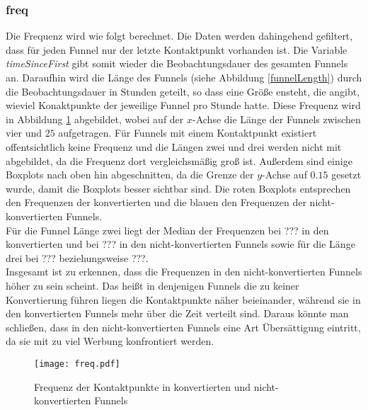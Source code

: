 \subsubsection*{freq}
Die Frequenz wird wie folgt berechnet. Die Daten werden dahingehend gefiltert, dass für jeden Funnel nur der letzte Kontaktpunkt vorhanden ist. Die Variable \textit{timeSinceFirst} gibt somit wieder die Beobachtungsdauer des gesamten Funnels an. Daraufhin wird die Länge des Funnels (siehe Abbildung \ref{funnelLength}) durch die Beobachtungsdauer in Stunden geteilt, so dass eine Größe ensteht, die angibt, wieviel Konaktpunkte der jeweilige Funnel pro Stunde hatte. Diese Frequenz wird in Abbildung \ref{freq} abgebildet, wobei auf der $x$-Achse die Länge der Funnels zwischen vier und $25$ aufgetragen. Für Funnels mit einem Kontaktpunkt existiert offentsichtlich keine Frequenz und die Längen zwei und drei werden nicht mit abgebildet, da die Frequenz dort vergleichsmäßig groß ist. Außerdem sind einige Boxplots nach oben hin abgeschnitten, da die Grenze der $y$-Achse auf $0.15$ gesetzt wurde, damit die Boxplots besser sichtbar sind. Die roten Boxplots entsprechen den Frequenzen der konvertierten und die blauen den Frequenzen der nicht-konvertierten Funnels.\\
Für die Funnel Länge zwei liegt der Median der Frequenzen bei ??? in den konvertierten und bei ??? in den nicht-konvertierten Funnels sowie für die Länge drei bei ??? beziehungsweise ???.\\
Insgesamt ist zu erkennen, dass die Frequenzen in den nicht-konvertierten Funnels höher zu sein scheint. Das heißt in denjenigen Funnels die zu keiner Konvertierung führen liegen die Kontaktpunkte näher beieinander, während sie in den konvertierten Funnels mehr über die Zeit verteilt sind. Daraus könnte man schließen, dass in den nicht-konvertierten Funnels eine Art Übersättigung eintritt, da sie mit zu viel Werbung konfrontiert werden.\\
\begin{figure}[H]
		\centering
	\texttt{[image: freq.pdf]}
	\caption{Frequenz der Kontaktpunkte in konvertierten und nicht-konvertierten Funnels}
	\label{freq}
\end{figure}
